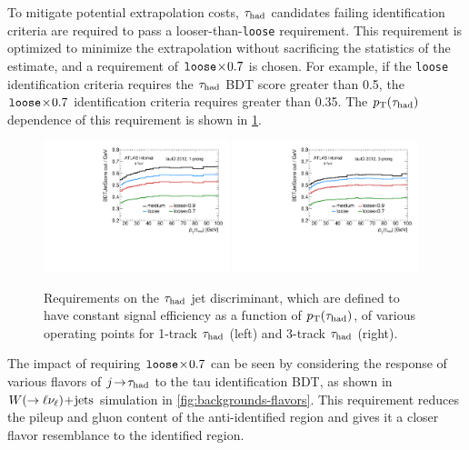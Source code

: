 To mitigate potential extrapolation costs, $\tau_\text{had}$ candidates failing identification criteria are required to pass a looser-than-\texttt{loose} requirement. This requirement is optimized to minimize the extrapolation without sacrificing the statistics of the estimate, and a requirement of $\texttt{loose}\!\times\!0.7$ is chosen. For example, if the \texttt{loose} identification criteria requires the $\tau_\text{had}$ BDT score greater than 0.5, the $\texttt{loose}\!\times\!0.7$ identification criteria requires greater than 0.35. The $p_{\mathrm{T}}(\tau_\text{had})$ dependence of this requirement is shown in \cref{fig:backgrounds-workingpoints}.

\begin{figure}[tp]
  \centering
  \includegraphics[width=0.48\textwidth]{figures/backgrounds/jetBDT-1p}
  \includegraphics[width=0.48\textwidth]{figures/backgrounds/jetBDT-3p}
  \caption{Requirements on the $\tau_\text{had}$ jet discriminant, which are defined to have constant signal efficiency as a function of $p_{\mathrm{T}}(\tau_\text{had})$, of various operating points for 1-track $\tau_\text{had}$ (left) and 3-track $\tau_\text{had}$ (right).}
  \label{fig:backgrounds-workingpoints}
\end{figure}

The impact of requiring $\texttt{loose}\!\times\!0.7$ can be seen by considering the response of various flavors of $j\!\rightarrow\!\tau_\text{had}$ to the tau identification BDT, as shown in $W (\rightarrow \ell\nu_\ell)\!+\!\text{jets}$ simulation in \cref{fig:backgrounds-flavors}. This requirement reduces the pileup and gluon content of the anti-identified region and gives it a closer flavor resemblance to the identified region.

